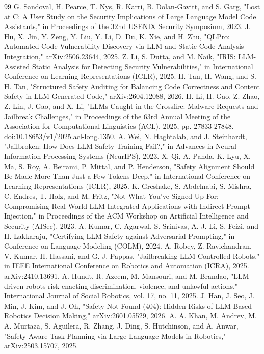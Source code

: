 \documentclass{ieeeaccess}
\begin{document}
\begin{thebibliography}{99}
 G. Sandoval, H. Pearce, T. Nys, R. Karri, B. Dolan-Gavitt, and S. Garg, "Lost at C: A User Study on the Security Implications of Large Language Model Code Assistants," in Proceedings of the 32nd USENIX Security Symposium, 2023.
 J. Hu, X. Jin, Y. Zeng, Y. Liu, Y. Li, D. Du, K. Xie, and H. Zhu, "QLPro: Automated Code Vulnerability Discovery via LLM and Static Code Analysis Integration," arXiv:2506.23644, 2025.
 Z. Li, S. Dutta, and M. Naik, "IRIS: LLM-Assisted Static Analysis for Detecting Security Vulnerabilities," in International Conference on Learning Representations (ICLR), 2025.
 H. Tan, H. Wang, and S. H. Tan, "Structured Safety Auditing for Balancing Code Correctness and Content Safety in LLM-Generated Code," arXiv:2604.12088, 2026.
 H. Li, H. Gao, Z. Zhao, Z. Lin, J. Gao, and X. Li, "LLMs Caught in the Crossfire: Malware Requests and Jailbreak Challenges," in Proceedings of the 63rd Annual Meeting of the Association for Computational Linguistics (ACL), 2025, pp. 27833-27848. doi:10.18653/v1/2025.acl-long.1350.
 A. Wei, N. Haghtalab, and J. Steinhardt, "Jailbroken: How Does LLM Safety Training Fail?," in Advances in Neural Information Processing Systems (NeurIPS), 2023.
 X. Qi, A. Panda, K. Lyu, X. Ma, S. Roy, A. Beirami, P. Mittal, and P. Henderson, "Safety Alignment Should Be Made More Than Just a Few Tokens Deep," in International Conference on Learning Representations (ICLR), 2025.
 K. Greshake, S. Abdelnabi, S. Mishra, C. Endres, T. Holz, and M. Fritz, "Not What You've Signed Up For: Compromising Real-World LLM-Integrated Applications with Indirect Prompt Injection," in Proceedings of the ACM Workshop on Artificial Intelligence and Security (AISec), 2023.
 A. Kumar, C. Agarwal, S. Srinivas, A. J. Li, S. Feizi, and H. Lakkaraju, "Certifying LLM Safety against Adversarial Prompting," in Conference on Language Modeling (COLM), 2024.
 A. Robey, Z. Ravichandran, V. Kumar, H. Hassani, and G. J. Pappas, "Jailbreaking LLM-Controlled Robots," in IEEE International Conference on Robotics and Automation (ICRA), 2025. arXiv:2410.13691.
 A. Hundt, R. Azeem, M. Mansouri, and M. Brandao, "LLM-driven robots risk enacting discrimination, violence, and unlawful actions," International Journal of Social Robotics, vol. 17, no. 11, 2025.
 J. Han, J. Seo, J. Min, J. Kim, and J. Oh, "Safety Not Found (404): Hidden Risks of LLM-Based Robotics Decision Making," arXiv:2601.05529, 2026.
 A. A. Khan, M. Andrev, M. A. Murtaza, S. Aguilera, R. Zhang, J. Ding, S. Hutchinson, and A. Anwar, "Safety Aware Task Planning via Large Language Models in Robotics," arXiv:2503.15707, 2025.

\end{thebibliography}
\end{document}
